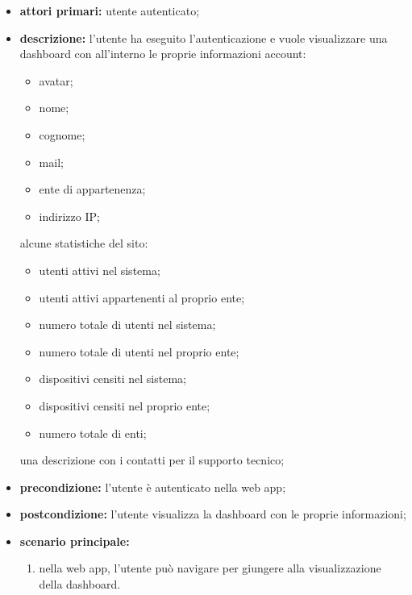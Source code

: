 		\begin{itemize}
			\item \textbf{attori primari:} utente autenticato;
			\item \textbf{descrizione:} l'utente ha eseguito l'autenticazione e vuole visualizzare una dashboard con all'interno le proprie informazioni account:
			\begin{itemize}
			 	\item avatar;
			 	\item nome;
			 	\item cognome;
			 	\item mail;
			 	\item ente di appartenenza;
			 	\item indirizzo IP;
			 \end{itemize}
			 alcune statistiche del sito:
			 \begin{itemize}
			  	\item utenti attivi nel sistema;
			  	\item utenti attivi appartenenti al proprio ente;
			   	\item numero totale di utenti nel sistema;
			   	\item numero totale di utenti nel proprio ente;
			   	\item dispositivi censiti nel sistema;
			   	\item dispositivi censiti nel proprio ente;
			   	\item numero totale di enti;
			 \end{itemize}
			 una descrizione con i contatti per il supporto tecnico;
			\item \textbf{precondizione:} l'utente è autenticato nella web app;
			\item \textbf{postcondizione:} l'utente visualizza la dashboard con le proprie informazioni;
			\item \textbf{scenario principale:}
			\begin{enumerate}
				\item nella web app, l'utente può navigare per giungere alla visualizzazione della dashboard.
			\end{enumerate}
		\end{itemize}


